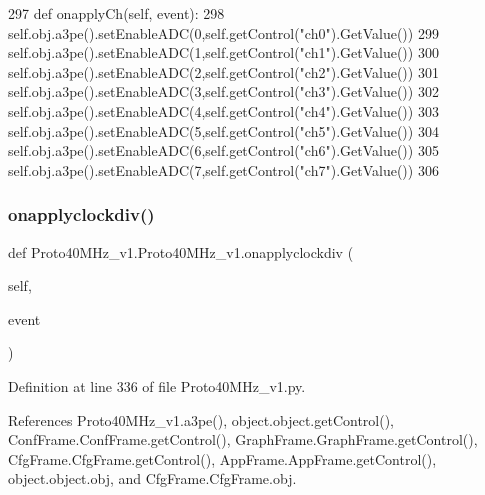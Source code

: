 \begin{DoxyCode}
297     \textcolor{keyword}{def }onapplyCh(self, event):
298         self.obj.a3pe().setEnableADC(0,self.getControl(\textcolor{stringliteral}{"ch0"}).GetValue())
299         self.obj.a3pe().setEnableADC(1,self.getControl(\textcolor{stringliteral}{"ch1"}).GetValue())
300         self.obj.a3pe().setEnableADC(2,self.getControl(\textcolor{stringliteral}{"ch2"}).GetValue())
301         self.obj.a3pe().setEnableADC(3,self.getControl(\textcolor{stringliteral}{"ch3"}).GetValue())
302         self.obj.a3pe().setEnableADC(4,self.getControl(\textcolor{stringliteral}{"ch4"}).GetValue())
303         self.obj.a3pe().setEnableADC(5,self.getControl(\textcolor{stringliteral}{"ch5"}).GetValue())
304         self.obj.a3pe().setEnableADC(6,self.getControl(\textcolor{stringliteral}{"ch6"}).GetValue())
305         self.obj.a3pe().setEnableADC(7,self.getControl(\textcolor{stringliteral}{"ch7"}).GetValue())
306         
\end{DoxyCode}
\mbox{\label{classProto40MHz__v1_1_1Proto40MHz__v1_aebb346c0ab965ffe6fa0296a29574253}} 
\subsubsection{\texorpdfstring{onapplyclockdiv()}{onapplyclockdiv()}}
{\footnotesize\ttfamily def Proto40\+M\+Hz\+\_\+v1.\+Proto40\+M\+Hz\+\_\+v1.\+onapplyclockdiv (\begin{DoxyParamCaption}\item[{}]{self,  }\item[{}]{event }\end{DoxyParamCaption})}



Definition at line 336 of file Proto40\+M\+Hz\+\_\+v1.\+py.



References Proto40\+M\+Hz\+\_\+v1.\+a3pe(), object.\+object.\+get\+Control(), Conf\+Frame.\+Conf\+Frame.\+get\+Control(), Graph\+Frame.\+Graph\+Frame.\+get\+Control(), Cfg\+Frame.\+Cfg\+Frame.\+get\+Control(), App\+Frame.\+App\+Frame.\+get\+Control(), object.\+object.\+obj, and Cfg\+Frame.\+Cfg\+Frame.\+obj.


